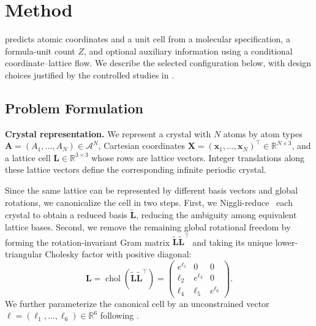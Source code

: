 \section{Method}
\label{sec:method}

\model{} predicts atomic coordinates and a unit cell from a molecular specification, a formula-unit count $Z$, and optional auxiliary information using a conditional coordinate--lattice flow. We describe the selected \model{} configuration below, with design choices justified by the controlled studies in .

\subsection{Problem Formulation}
\label{sec:method-problem}

\textbf{Crystal representation.}
We represent a crystal with $N$ atoms by atom types
$\mathbf{A}=(A_1,\ldots,A_N)\in\mathcal{A}^{N}$, Cartesian coordinates
$\mathbf{X}=(\mathbf{x}_1,\ldots,\mathbf{x}_N)^{\top}\in\mathbb{R}^{N\times3}$, and a
lattice cell $\mathbf{L}\in\mathbb{R}^{3\times3}$ whose rows are lattice
vectors. Integer translations along these lattice vectors define the corresponding
infinite periodic crystal.

Since the same lattice can be represented by different basis vectors and global
rotations, we canonicalize the cell in two steps. First, we Niggli-reduce~\citep{krivy1976unified,grosse2004numerically} each
crystal to obtain a reduced basis $\widetilde{\mathbf{L}}$, reducing the ambiguity among equivalent lattice bases. Second, we remove the remaining global rotational
freedom by forming the rotation-invariant Gram matrix
$\widetilde{\mathbf{L}}\widetilde{\mathbf{L}}^{\top}$ and taking its unique
lower-triangular Cholesky factor with positive diagonal:
\begin{equation*}
\mathbf{L}=\operatorname{chol}\!\left(
\widetilde{\mathbf{L}}\widetilde{\mathbf{L}}^{\top}
\right)=
\begin{pmatrix}
e^{\ell_1} & 0 & 0 \\
\ell_2 & e^{\ell_3} & 0 \\
\ell_4 & \ell_5 & e^{\ell_6}
\end{pmatrix}.
\end{equation*}
We further parameterize the canonical cell by an unconstrained vector  $\boldsymbol{\ell}=(\ell_1,\ldots,\ell_6)\in\mathbb{R}^{6}$ following \citet{veljkovic2026crystalite}.

